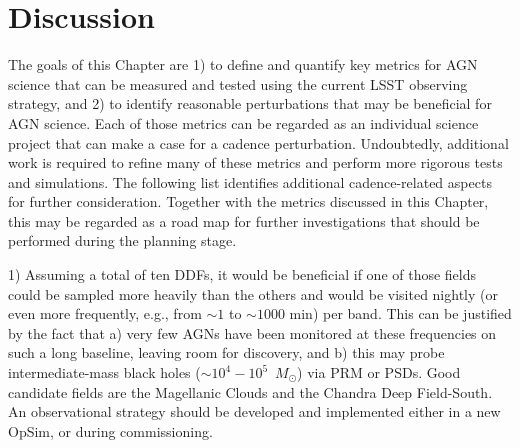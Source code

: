



%











\section{Discussion}
\label{sec:\chpname:discussion}



The goals of this Chapter are 1) to define and quantify key metrics for AGN
science that can be measured and tested using the current LSST observing
strategy, and 2) to identify reasonable perturbations that may be beneficial
for AGN science.
%
Each of those metrics can be regarded as an individual science project
that can make a case for a cadence perturbation.
%
Undoubtedly, additional work is required to refine many of these metrics
and perform more rigorous tests and simulations.
%
The following list identifies additional cadence-related aspects for further
consideration. Together with the metrics discussed in this Chapter, this may
be regarded as a road map for further investigations that should be performed
during the planning stage.

1) Assuming a total of ten DDFs, it would be beneficial if one of those fields
could be sampled more heavily than the others and would be visited nightly (or
even more frequently, e.g., from $\sim1$ to $\sim1000$ min) per band.
This can be justified by the fact that a) very few AGNs have been monitored
at these frequencies on such a long baseline, leaving room for discovery,
and b) this may probe intermediate-mass black holes
($\sim10^4 - 10^5$~$M_{\odot}$) via PRM or PSDs. Good candidate fields are
the Magellanic Clouds and the Chandra Deep Field-South. An observational
strategy should be developed and implemented either in a new OpSim, or
during commissioning.


